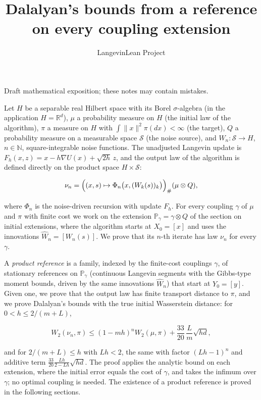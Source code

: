 \documentclass[11pt,a4paper]{article}
\title{\texorpdfstring{Dalalyan's bounds from a reference on every coupling extension}{Dalalyan's bounds from a reference on every coupling extension}}
\author{LangevinLean Project}
\date{}
\begin{document}
\maketitle
Draft mathematical exposition; these notes may contain mistakes.


Let \(H\) be a separable real Hilbert space with its Borel \(\sigma\)-algebra (in the application \(H=\mathbb R^d\)), \(\mu\) a probability measure on \(H\) (the initial law of the algorithm), \(\pi\) a measure on \(H\) with \(\int\|x\|^2\pi(dx)<\infty\) (the target), \(Q\) a probability measure on a measurable space \(\mathcal S\) (the noise source), and \(W_n:\mathcal S\to H\), \(n\in\mathbb N\), square-integrable noise functions. The unadjusted Langevin update is \(F_h(x,z)=x-h\nabla U(x)+\sqrt{2h}\,z\), and the output law of the algorithm is defined directly on the product space \(H\times\mathcal S\):


\[\nu_n=\Bigl((x,s)\mapsto\Phi_n\bigl(x,(W_k(s))_{k}\bigr)\Bigr)_\#(\mu\otimes Q),\]


where \(\Phi_n\) is the noise-driven recursion with update \(F_h\). For every coupling \(\gamma\) of \(\mu\) and \(\pi\) with finite cost we work on the extension \(\mathbb P_\gamma=\gamma\otimes Q\) of the section on initial extensions, where the algorithm starts at \(X_0=[x]\) and uses the innovations \(\widehat W_n=[W_n(s)]\). We prove that its \(n\)-th iterate has law \(\nu_n\) for every \(\gamma\).




A \emph{product reference} is a family, indexed by the finite-cost couplings \(\gamma\), of stationary references on \(\mathbb P_\gamma\) (continuous Langevin segments with the Gibbs-type moment bounds, driven by the same innovations \(\widehat W_n\)) that start at \(Y_0=[y]\). Given one, we prove that the output law has finite transport distance to \(\pi\), and we prove Dalalyan's bounds with the true initial Wasserstein distance: for \(0<h\le2/(m+L)\),


\[W_2(\nu_n,\pi)\le(1-mh)^nW_2(\mu,\pi)+\frac{33}{20}\,\frac Lm\sqrt{hd},\]


and for \(2/(m+L)\le h\) with \(Lh<2\), the same with factor \((Lh-1)^n\) and additive term \(\frac{33}{20}\frac{Lh}{2-Lh}\sqrt{hd}\). The proof applies the analytic bound on each extension, where the initial error equals the cost of \(\gamma\), and takes the infimum over \(\gamma\); no optimal coupling is needed. The existence of a product reference is proved in the following sections.
\end{document}
